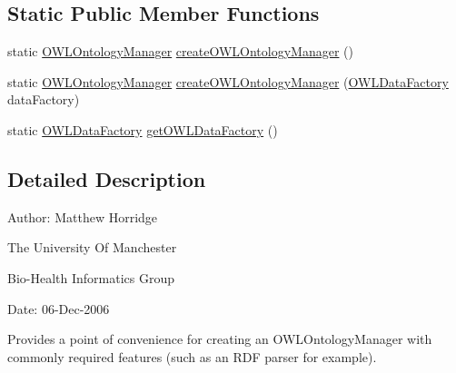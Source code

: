 \subsection*{Static Public Member Functions}
\begin{DoxyCompactItemize}
\item 
static \hyperlink{interfaceorg_1_1semanticweb_1_1owlapi_1_1model_1_1_o_w_l_ontology_manager}{O\-W\-L\-Ontology\-Manager} \hyperlink{classorg_1_1semanticweb_1_1owlapi_1_1apibinding_1_1_o_w_l_manager_abc0ad7de287f11f0c78a9506e740d8e2}{create\-O\-W\-L\-Ontology\-Manager} ()
\item 
static \hyperlink{interfaceorg_1_1semanticweb_1_1owlapi_1_1model_1_1_o_w_l_ontology_manager}{O\-W\-L\-Ontology\-Manager} \hyperlink{classorg_1_1semanticweb_1_1owlapi_1_1apibinding_1_1_o_w_l_manager_acd976f5581512f55d5768d2425c4d21c}{create\-O\-W\-L\-Ontology\-Manager} (\hyperlink{interfaceorg_1_1semanticweb_1_1owlapi_1_1model_1_1_o_w_l_data_factory}{O\-W\-L\-Data\-Factory} data\-Factory)
\item 
static \hyperlink{interfaceorg_1_1semanticweb_1_1owlapi_1_1model_1_1_o_w_l_data_factory}{O\-W\-L\-Data\-Factory} \hyperlink{classorg_1_1semanticweb_1_1owlapi_1_1apibinding_1_1_o_w_l_manager_aa1c4536a1e6ec54da82c88dc0e58e962}{get\-O\-W\-L\-Data\-Factory} ()
\end{DoxyCompactItemize}


\subsection{Detailed Description}
Author\-: Matthew Horridge\par
 The University Of Manchester\par
 Bio-\/\-Health Informatics Group\par
 Date\-: 06-\/\-Dec-\/2006\par
\par
 

Provides a point of convenience for creating an {\ttfamily O\-W\-L\-Ontology\-Manager} with commonly required features (such as an R\-D\-F parser for example). 


